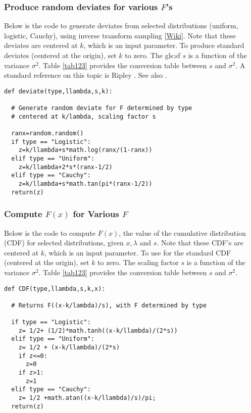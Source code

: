 \documentclass[10pt]{article}
\begin{document}
\subsubsection{Produce random deviates for various $F$'s} \label{deviates} 
Below is the code to generate \textcolor{index}{deviates} from selected distributions (\textcolor{index}{uniform}, \textcolor{index}{logistic}, \textcolor{index}{Cauchy}), using \textcolor{index}{inverse transform sampling} [\href{https://en.wikipedia.org/wiki/Inverse_transform_sampling}{Wiki}]. Note that these deviates are centered at $k$, which is an input parameter. To produce standard deviates (centered at the origin), set $k$ to zero. The \gls{gls:sf} $s$ is a function of the variance $\sigma^2$. Table \ref{tab123} provides the conversion table between $s$ and $\sigma^2$. A standard reference on this topic is Ripley \cite{ripley}. See also \cite{hbsimul}.

\begin{lstlisting}
def deviate(type,llambda,s,k):

  # Generate random deviate for F determined by type
  # centered at k/lambda, scaling factor s

  ranx=random.random()
  if type == "Logistic":
    z=k/llambda+s*math.log(ranx/(1-ranx))
  elif type == "Uniform":
    z=k/llambda+2*s*(ranx-1/2)
  elif type == "Cauchy":
    z=k/llambda+s*math.tan(pi*(ranx-1/2))
  return(z)
\end{lstlisting}
\subsubsection{Compute $F(x)$ for Various $F$}\label{scdf}
Below is the code to compute $F(x)$, the value of the cumulative distribution (CDF) for selected distributions, given $x, \lambda$ and $s$. Note that these CDF's are centered at $k$, which is an input parameter. To use for the standard CDF (centered at the origin), set $k$ to zero. The scaling factor $s$ is a function of the variance $\sigma^2$. Table \ref{tab123} provides the conversion table between $s$ and $\sigma^2$.  

\begin{lstlisting}
def CDF(type,llambda,s,k,x):

  # Returns F((x-k/lambda)/s), with F determined by type

  if type == "Logistic":
    z= 1/2+ (1/2)*math.tanh((x-k/llambda)/(2*s))
  elif type == "Uniform":
    z= 1/2 + (x-k/llambda)/(2*s)
    if z<=0: 
      z=0
    if z>1: 
      z=1
  elif type == "Cauchy":
    z= 1/2 +math.atan((x-k/llambda)/s)/pi;
  return(z)
\end{lstlisting}
\end{document}
